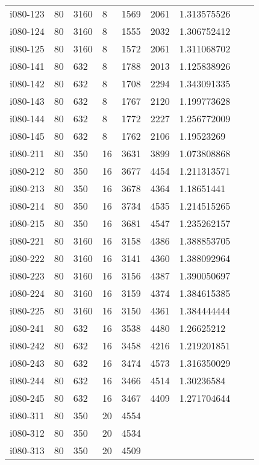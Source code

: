 \begin{appendices}
\begin{longtable}[htbp]{l l l l l l l l l}
 i080-123	&	80 	&	3160 	&	8 	&	1569	&	2061	&	1.313575526	&		\\
 i080-124	&	80 	&	3160 	&	8 	&	1555	&	2032	&	1.306752412	&		\\
 i080-125	&	80 	&	3160 	&	8 	&	1572	&	2061	&	1.311068702	&		\\
\hline
 i080-141	&	80 	&	632 	&	8 	&	1788	&	2013	&	1.125838926	&		\\
 i080-142	&	80 	&	632 	&	8 	&	1708	&	2294	&	1.343091335	&		\\
 i080-143	&	80 	&	632 	&	8 	&	1767	&	2120	&	1.199773628	&		\\
 i080-144	&	80 	&	632 	&	8 	&	1772	&	2227	&	1.256772009	&		\\
 i080-145	&	80 	&	632 	&	8 	&	1762	&	2106	&	1.19523269	&		\\
\hline
 i080-211	&	80 	&	350 	&	16 	&	3631	&	3899	&	1.073808868	&		\\
 i080-212	&	80 	&	350 	&	16 	&	3677	&	4454	&	1.211313571	&		\\
 i080-213	&	80 	&	350 	&	16 	&	3678	&	4364	&	1.18651441	&		\\
 i080-214	&	80 	&	350 	&	16 	&	3734	&	4535	&	1.214515265	&		\\
 i080-215	&	80 	&	350 	&	16 	&	3681	&	4547	&	1.235262157	&		\\
\hline
 i080-221	&	80 	&	3160 	&	16 	&	3158	&	4386	&	1.388853705	&		\\
 i080-222	&	80 	&	3160 	&	16 	&	3141	&	4360	&	1.388092964	&		\\
 i080-223	&	80 	&	3160 	&	16 	&	3156	&	4387	&	1.390050697	&		\\
 i080-224	&	80 	&	3160 	&	16 	&	3159	&	4374	&	1.384615385	&		\\
 i080-225	&	80 	&	3160 	&	16 	&	3150	&	4361	&	1.384444444	&		\\
\hline
 i080-241	&	80 	&	632 	&	16 	&	3538	&	4480	&	1.26625212	&		\\
 i080-242	&	80 	&	632 	&	16 	&	3458	&	4216	&	1.219201851	&		\\
 i080-243	&	80 	&	632 	&	16 	&	3474	&	4573	&	1.316350029	&		\\
 i080-244	&	80 	&	632 	&	16 	&	3466	&	4514	&	1.30236584	&		\\
 i080-245	&	80 	&	632 	&	16 	&	3467	&	4409	&	1.271704644	&		\\
\hline
 i080-311	&	80 	&	350 	&	20 	&	4554	&		&		&		\\
 i080-312	&	80 	&	350 	&	20 	&	4534	&		&		&		\\
 i080-313	&	80 	&	350 	&	20 	&	4509	&		&		&		\\

\end{longtable}
\end{appendices}
